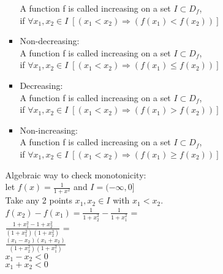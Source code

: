 \documentclass{article}
\begin{document}
\begin{enumerate}
\begin{itemize}
\begin{itemize}
		A function f is called increasing on a set $I \subset D_f$, \\
		if $\forall x_1, x_2 \in I \; [(x_1 < x_2) \Rightarrow (f(x_1) < f(x_2))]$
		\item Non-decreasing: \\
		A function f is called increasing on a set $I \subset D_f$, \\
		if $\forall x_1, x_2 \in I \; [(x_1 < x_2) \Rightarrow (f(x_1) \leq f(x_2))]$
		\item Decreasing: \\
		A function f is called increasing on a set $I \subset D_f$, \\
		if $\forall x_1, x_2 \in I \; [(x_1 < x_2) \Rightarrow (f(x_1) > f(x_2))]$
		\item Non-increasing: \\
		A function f is called increasing on a set $I \subset D_f$, \\
		if $\forall x_1, x_2 \in I \; [(x_1 < x_2) \Rightarrow (f(x_1) \geq f(x_2))]$
	\end{itemize}
	Algebraic way to check monotonicity: \\
	let $f(x) = \frac{1}{1+x^2}$ and $I = (-\infty, 0]$ \\
	Take any 2 points $x_1, x_2 \in I$ with $x_1 < x_2$. \\
	$f(x_2) - f(x_1) = \frac{1}{1+x_2^2} - \frac{1}{1+x_1^2}$ = \\
	$\frac{1+x_1^2 - 1 + x_2^2}{(1+x_1^2)(1+x_2^2)}$ = \\
	$\frac{(x_1-x_2)(x_1+x_2)}{(1+x_2^2)(1+x_1^2)}$ \\
	$x_1 - x_2  < 0$ \\
	$x_1 + x_2 < 0$ \\
	\end{itemize}

\end{enumerate}
\end{document}
